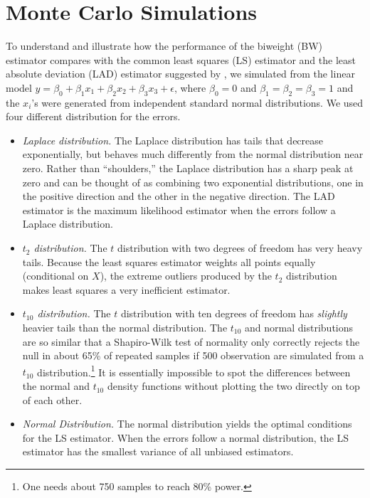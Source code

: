 \documentclass[12pt]{article}
\begin{document}
\section*{Monte Carlo Simulations}

To understand and illustrate how the performance of the biweight (BW) estimator compares with the common least squares (LS) estimator and the least absolute deviation (LAD) estimator suggested by \cite{HardenDesmarais2011}, we simulated from the linear model $y = \beta_0 + \beta_1x_1 + \beta_2 x_2 + \beta_3 x_3 + \epsilon$, where $\beta_0 = 0$ and $\beta_1 = \beta_2 = \beta_3 = 1$ and the $x_i$'s were generated from independent standard normal distributions. 
We used four different distribution for the errors.
\begin{itemize}
\item \textit{Laplace distribution.} 
The Laplace distribution has tails that decrease exponentially, but behaves much differently from the normal distribution near zero. 
Rather than ``shoulders,'' the Laplace distribution has a sharp peak at zero and can be thought of as combining two exponential distributions, one in the positive direction and the other in the negative direction.
The LAD estimator is the maximum likelihood estimator when the errors follow a Laplace distribution.
\item \textit{$t_2$ distribution.} 
The $t$ distribution with two degrees of freedom has very heavy tails. 
Because the least squares estimator weights all points equally (conditional on $X$), the extreme outliers produced by the $t_2$ distribution makes least squares a very inefficient estimator.
\item \textit{$t_{10}$ distribution.} 
The $t$ distribution with ten degrees of freedom has \textit{slightly} heavier tails than the normal distribution. 
The $t_{10}$ and normal distributions are so similar that a Shapiro-Wilk test of normality only correctly rejects the null in about 65\% of repeated samples if 500 observation are simulated from a $t_{10}$ distribution.\footnote{One needs about 750 samples to reach 80\% power.} 
It is essentially impossible to spot the differences between the normal and $t_{10}$ density functions without plotting the two directly on top of each other.
\item \textit{Normal Distribution.} The normal distribution yields the optimal conditions for the LS estimator. 
When the errors follow a normal distribution, the LS estimator has the smallest variance of all unbiased estimators. 
\end{itemize}
\end{document}

